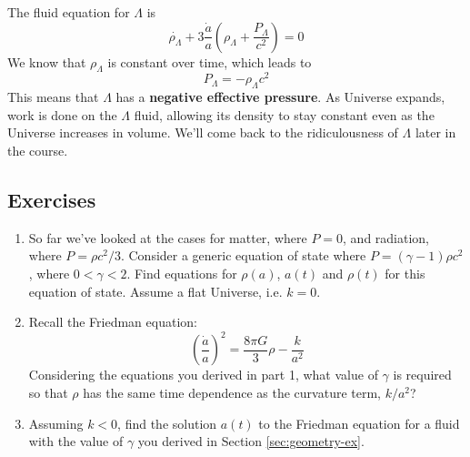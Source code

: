 \documentclass[11pt,a4paper,notoc]{tufte-handout}
\begin{document}
The fluid equation for \(\Lambda\) is
\begin{equation}
\dot{\rho_{\Lambda}} + 3\frac{\dot{a}}{a} \left(\rho_{\Lambda} + \dfrac{P_{\Lambda}}{c^2}\right) = 0
\label{eq:rho-lambda-1}
\end{equation}
We know that \(\rho_{\Lambda}\) is constant over time, which leads to
\begin{equation}
P_\Lambda = -\rho_{\Lambda}c^2
\label{eq:rho-lambda-2}
\end{equation}
This means that \(\Lambda\) has a
\textbf{negative effective pressure}. As Universe expands, work is done on
the \(\Lambda\) fluid, allowing its density to stay constant even as the
Universe increases in volume. We'll come back to the ridiculousness of
\(\Lambda\) later in the course.

\hypertarget{sec:composition_ex}{%
\subsection{Exercises}\label{sec:composition_ex}}

\begin{enumerate}
\def\labelenumi{\arabic{enumi}.}
\item
  So far we've looked at the cases for matter, where \(P = 0\), and
  radiation, where \(P = \rho c^2 / 3\). Consider a generic equation of
  state where \(P = (\gamma - 1) \rho c^2\), where \(0 < \gamma < 2\).
  Find equations for \(\rho(a)\), \(a(t)\) and \(\rho(t)\) for this equation
  of state. Assume a flat Universe, i.e. \(k=0\).
\item
  Recall the Friedman equation:
  \[\left(\dfrac{\dot{a}}{a}\right)^2 = \dfrac{8\pi G}{3}\rho - \dfrac{k}{a^2}\]
  Considering the equations you derived in part 1, what value of
  \(\gamma\) is required so that \(\rho\) has the same time dependence as
  the curvature term, \(k/a^2\)?
\item
  Assuming \(k<0\), find the solution \(a(t)\) to the Friedman equation
  for a fluid with the value of \(\gamma\) you derived in Section \ref{sec:geometry-ex}.
\end{enumerate}


\end{document}
